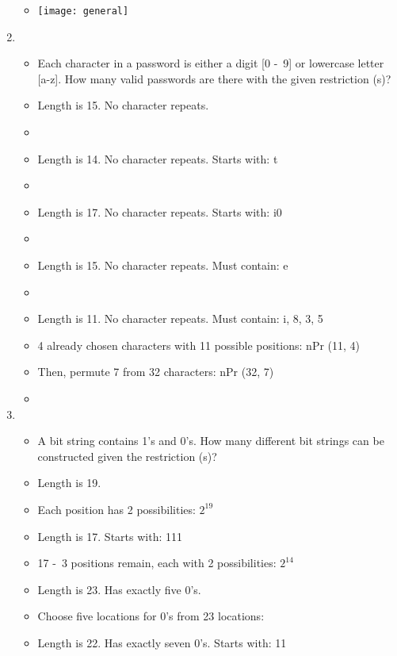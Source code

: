 \documentclass[12pt,a4paper]{article}
\begin{document}
\begin{enumerate}
\begin{itemize}
    \item[] \texttt{[image: general]} 
  \end{itemize}
  \item {}
  \begin{itemize}
    \item Each character in a password is either a digit [0 -\ 9] or lowercase letter [a-z]. How many valid passwords are there with the given restriction (s)?
    \item Length is 15. No character repeats.
    \item[]  
    \item Length is 14. No character repeats. Starts with: t
    \item[] 
    \item Length is 17. No character repeats. Starts with: i0
    \item[] 
    \item Length is 15. No character repeats. Must contain: e
    \item[] 
    \item Length is 11. No character repeats. Must contain: i, 8, 3, 5
    \item[] 4 already chosen characters with 11 possible positions: nPr (11, 4)
    \item[] Then, permute 7 from 32 characters: nPr (32, 7)
    \item[] 
  \end{itemize}
  \item {}
  \begin{itemize}
    \item A bit string contains 1's and 0's. How many different bit strings can be constructed given the restriction (s)?
    \item Length is 19.
    \item[] Each position has 2 possibilities: \(\boxed{2^{19}}\)
    \item Length is 17. Starts with: 111
    \item[] 17 -\ 3 positions remain, each with 2 possibilities: \(\boxed{2^{14}}\) 
    \item Length is 23. Has exactly five 0's.
    \item[] Choose five locations for 0's from 23 locations:  
    \item Length is 22. Has exactly seven 0's. Starts with: 11

\end{itemize}
\end{enumerate}
\end{document}
